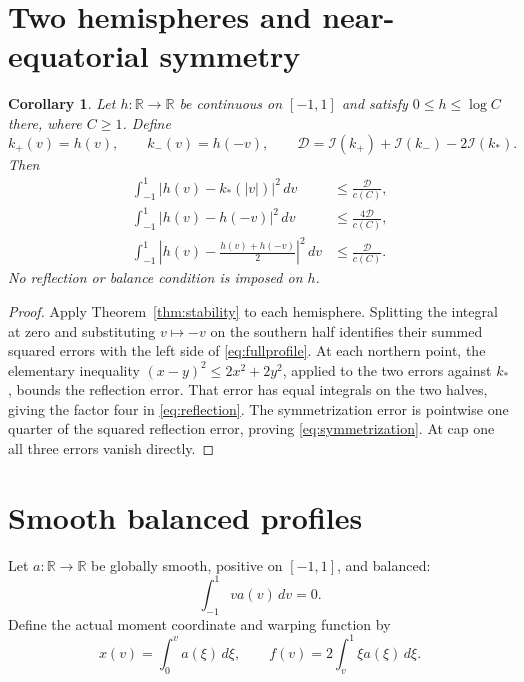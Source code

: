 \documentclass[11pt]{article}
\newtheorem{corollary}[theorem]{Corollary}
\newcommand{\I}{\mathcal I}
\newcommand{\R}{\mathbb R}
\begin{document}
\section{Two hemispheres and near-equatorial symmetry}

\begin{corollary}\label{cor:hemispheres}
Let $h:\R\to\R$ be continuous on $[-1,1]$ and satisfy
$0\leq h\leq\log C$ there, where $C\geq1$. Define
\[
 k_+(v)=h(v),\qquad k_-(v)=h(-v),\qquad
 \mathcal D=\I(k_+)+\I(k_-)-2\I(k_*).
\]
Then
\begin{align}
 \int_{-1}^1|h(v)-k_*(|v|)|^2\,dv
       &\leq\frac{\mathcal D}{c(C)},\label{eq:fullprofile}\\
 \int_{-1}^1|h(v)-h(-v)|^2\,dv
       &\leq\frac{4\mathcal D}{c(C)},\label{eq:reflection}\\
 \int_{-1}^1\left|h(v)-\frac{h(v)+h(-v)}2\right|^2\,dv
       &\leq\frac{\mathcal D}{c(C)}.\label{eq:symmetrization}
\end{align}
No reflection or balance condition is imposed on $h$.
\end{corollary}
\begin{proof}
Apply Theorem~\ref{thm:stability} to each hemisphere. Splitting the
integral at zero and substituting $v\mapsto-v$ on the southern half
identifies their summed squared errors with the left side of
\eqref{eq:fullprofile}. At each northern point, the elementary inequality
$(x-y)^2\leq2x^2+2y^2$, applied to the two errors against $k_*$,
bounds the reflection error. That error has equal integrals on the two
halves, giving the factor four in \eqref{eq:reflection}.
The symmetrization error is pointwise one quarter of the squared
reflection error, proving \eqref{eq:symmetrization}.
At cap one all three errors vanish directly.
\end{proof}

\section{Smooth balanced profiles}

Let $a:\R\to\R$ be globally smooth, positive on $[-1,1]$, and balanced:
\begin{equation}\label{eq:balance}
 \int_{-1}^1 v a(v)\,dv=0.
\end{equation}
Define the actual moment coordinate and warping function by
\begin{equation}\label{eq:warping}
 x(v)=\int_0^v a(\xi)\,d\xi,
 \qquad f(v)=2\int_v^1 \xi a(\xi)\,d\xi.
\end{equation}
\end{document}
